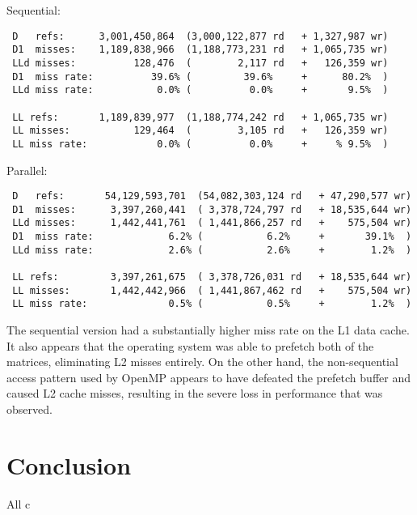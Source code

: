 \documentclass{article}
\begin{document}
Sequential:
\begin{verbatim}
 D   refs:      3,001,450,864  (3,000,122,877 rd   + 1,327,987 wr)
 D1  misses:    1,189,838,966  (1,188,773,231 rd   + 1,065,735 wr)
 LLd misses:          128,476  (        2,117 rd   +   126,359 wr)
 D1  miss rate:          39.6% (         39.6%     +      80.2%  )
 LLd miss rate:           0.0% (          0.0%     +       9.5%  )
 
 LL refs:       1,189,839,977  (1,188,774,242 rd   + 1,065,735 wr)
 LL misses:           129,464  (        3,105 rd   +   126,359 wr)
 LL miss rate:            0.0% (          0.0%     +     % 9.5%  )
\end{verbatim}

Parallel:
\begin{verbatim}
 D   refs:       54,129,593,701  (54,082,303,124 rd   + 47,290,577 wr)
 D1  misses:      3,397,260,441  ( 3,378,724,797 rd   + 18,535,644 wr)
 LLd misses:      1,442,441,761  ( 1,441,866,257 rd   +    575,504 wr)
 D1  miss rate:             6.2% (           6.2%     +       39.1%  )
 LLd miss rate:             2.6% (           2.6%     +        1.2%  )
 
 LL refs:         3,397,261,675  ( 3,378,726,031 rd   + 18,535,644 wr)
 LL misses:       1,442,442,966  ( 1,441,867,462 rd   +    575,504 wr)
 LL miss rate:              0.5% (           0.5%     +        1.2%  )
\end{verbatim}

The sequential version had a substantially higher miss rate on the L1
data cache. It also appears that the operating system was able to
prefetch both of the matrices, eliminating L2 misses entirely. On the
other hand, the non-sequential access pattern used by OpenMP appears
to have defeated the prefetch buffer and caused L2 cache misses,
resulting in the severe loss in performance that was observed.

\section{Conclusion}
All c



\nocite{*}
\end{document}
